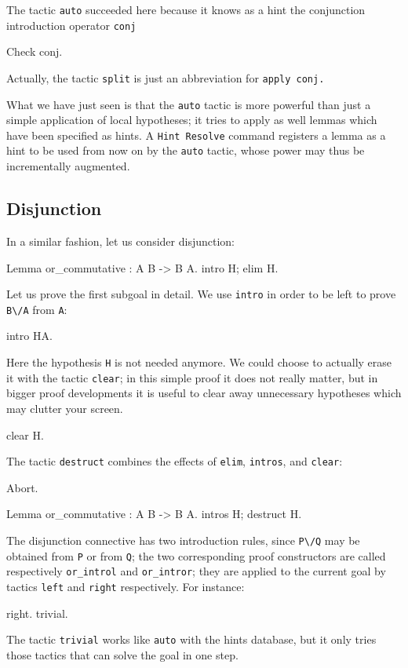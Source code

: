 \documentclass[11pt,a4paper]{book}
\begin{document}
The tactic \verb:auto: succeeded here because it knows as a hint the 
conjunction introduction operator \verb+conj+
\begin{coq_example}
Check conj.
\end{coq_example}

Actually, the tactic \verb+split+ is just an abbreviation for \verb+apply conj.+

What we have just seen is that the \verb:auto: tactic is more powerful than
just a simple application of local hypotheses; it tries to apply as well 
lemmas which have been specified as hints. A 
\verb:Hint Resolve: command registers a
lemma as a hint to be used from now on by the \verb:auto: tactic, whose power 
may thus be incrementally augmented.

\subsection{Disjunction}

In a similar fashion, let us consider disjunction:

\begin{coq_example}
Lemma or_commutative : A \/ B -> B \/ A.
intro H; elim H.
\end{coq_example}

Let us prove the first subgoal in detail. We use \verb:intro: in order to
be left to prove \verb:B\/A: from \verb:A::

\begin{coq_example}
intro HA.
\end{coq_example}

Here the hypothesis \verb:H: is not needed anymore. We could choose to
actually erase it with the tactic \verb:clear:; in this simple proof it
does not really matter, but in bigger proof developments it is useful to
clear away unnecessary hypotheses which may clutter your screen.
\begin{coq_example}
clear H.
\end{coq_example}

The tactic \verb:destruct: combines the effects of \verb:elim:, \verb:intros:,
and \verb:clear::

\begin{coq_eval}
Abort.
\end{coq_eval}
\begin{coq_example}
Lemma or_commutative : A \/ B -> B \/ A.
intros H; destruct H.
\end{coq_example}

The disjunction connective has two introduction rules, since \verb:P\/Q:
may be obtained from \verb:P: or from \verb:Q:; the two corresponding
proof constructors are called respectively \verb:or_introl: and
\verb:or_intror:; they are applied to the current goal by tactics
\verb:left: and \verb:right: respectively. For instance:
\begin{coq_example}
right.
trivial.
\end{coq_example}
The tactic \verb:trivial: works like \verb:auto: with the hints
database, but it only tries those tactics that can solve the goal in one
step. 
\end{document}

